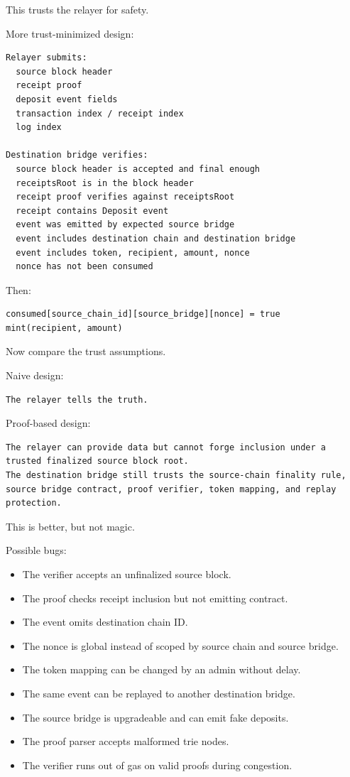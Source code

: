 This trusts the relayer for safety.

More trust-minimized design:

\begin{lstlisting}
Relayer submits:
  source block header
  receipt proof
  deposit event fields
  transaction index / receipt index
  log index

Destination bridge verifies:
  source block header is accepted and final enough
  receiptsRoot is in the block header
  receipt proof verifies against receiptsRoot
  receipt contains Deposit event
  event was emitted by expected source bridge
  event includes destination chain and destination bridge
  event includes token, recipient, amount, nonce
  nonce has not been consumed
\end{lstlisting}

Then:

\begin{lstlisting}
consumed[source_chain_id][source_bridge][nonce] = true
mint(recipient, amount)
\end{lstlisting}

Now compare the trust assumptions.

Naive design:

\begin{lstlisting}
The relayer tells the truth.
\end{lstlisting}

Proof-based design:

\begin{lstlisting}
The relayer can provide data but cannot forge inclusion under a trusted finalized source block root.
The destination bridge still trusts the source-chain finality rule, source bridge contract, proof verifier, token mapping, and replay protection.
\end{lstlisting}

This is better, but not magic.

Possible bugs:

\begin{itemize}
\tightlist
\item
  The verifier accepts an unfinalized source block.
\item
  The proof checks receipt inclusion but not emitting contract.
\item
  The event omits destination chain ID.
\item
  The nonce is global instead of scoped by source chain and source
  bridge.
\item
  The token mapping can be changed by an admin without delay.
\item
  The same event can be replayed to another destination bridge.
\item
  The source bridge is upgradeable and can emit fake deposits.
\item
  The proof parser accepts malformed trie nodes.
\item
  The verifier runs out of gas on valid proofs during congestion.
\end{itemize}

